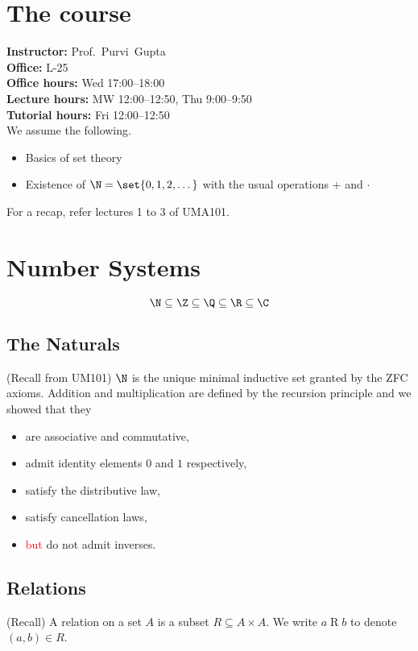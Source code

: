
\chapter*{The course} \label{chp:course}
\textbf{Instructor:} Prof.~Purvi~Gupta\\
\textbf{Office:} L-25\\
\textbf{Office hours:} Wed 17:00--18:00\\
\textbf{Lecture hours:} MW 12:00--12:50, Thu 9:00--9:50\\
\textbf{Tutorial hours:} Fri 12:00--12:50\\

We assume the following.
\begin{itemize}
    \item Basics of set theory
    \item Existence of $\N = \set{0, 1, 2, \dots}$ with the usual operations
    $+$ and $\cdot$
\end{itemize}
For a recap, refer lectures 1 to 3 of UMA101.

\chapter{Number Systems} \label{chp:number_systems}
\[
    \N \subseteq \Z \subseteq \Q \subseteq \R \subseteq \C
\]
\section{The Naturals} \label{sec:naturals}
(Recall from UM101) $\N$ is the unique minimal inductive set granted by the ZFC
axioms.
Addition and multiplication are defined by the recursion principle and we showed
that they
\begin{itemize}
    \item are associative and commutative,
    \item admit identity elements $0$ and $1$ respectively,
    \item satisfy the distributive law,
    \item satisfy cancellation laws,
    \item \textcolor{Red}{but} do not admit inverses.
\end{itemize}

\section{Relations} \label{sec:relations}
(Recall) A relation on a set $A$ is a subset $R \subseteq A \times A$.
We write $a \mathrel{R} b$ to denote $(a, b) \in R$.

